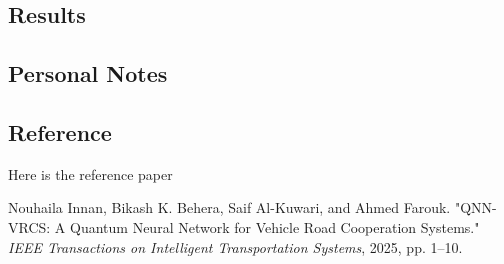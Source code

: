 \documentclass[12pt,a4paper]{article}
\begin{document}
\subsection*{Results}


\subsection*{Personal Notes}


\subsection*{Reference}
Here is the reference paper \cite{QNN-VRCS}

\newpage
\begin{thebibliography}{99}
  Nouhaila Innan, Bikash K. Behera, Saif Al-Kuwari, and Ahmed Farouk.  
  "QNN-VRCS: A Quantum Neural Network for Vehicle Road Cooperation Systems."  
  \textit{IEEE Transactions on Intelligent Transportation Systems}, 2025, pp. 1--10.
\end{thebibliography}
\end{document}
